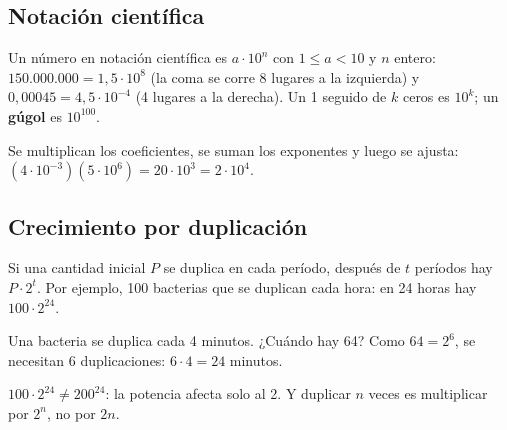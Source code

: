 \subsection{Notación científica}
Un número en notación científica es $a\cdot 10^n$ con $1 \le a < 10$ y $n$ entero: $150.000.000 = 1{,}5\cdot 10^8$ (la coma se corre 8 lugares a la izquierda) y $0{,}00045 = 4{,}5\cdot 10^{-4}$ (4 lugares a la derecha). Un 1 seguido de $k$ ceros es $10^k$; un \textbf{gúgol} es $10^{100}$.
\begin{clave}[Operar] Se multiplican los coeficientes, se suman los exponentes y luego se ajusta: $(4\cdot 10^{-3})(5\cdot 10^6) = 20\cdot 10^3 = 2\cdot 10^4$.\end{clave}

\subsection{Crecimiento por duplicación}
Si una cantidad inicial $P$ se duplica en cada período, después de $t$ períodos hay $P\cdot 2^t$. Por ejemplo, 100 bacterias que se duplican cada hora: en 24 horas hay $100\cdot 2^{24}$.
\begin{ejemplo}[Al revés] Una bacteria se duplica cada 4 minutos. ¿Cuándo hay 64? Como $64 = 2^6$, se necesitan 6 duplicaciones: $6\cdot 4 = 24$ minutos.\end{ejemplo}
\begin{ojo} $100\cdot 2^{24} \neq 200^{24}$: la potencia afecta solo al 2. Y duplicar $n$ veces es multiplicar por $2^n$, no por $2n$.\end{ojo}

